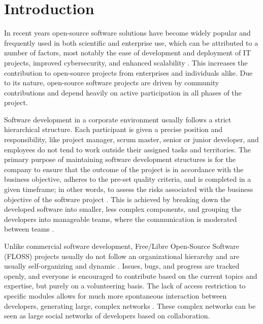 \thepage
\section{Introduction}


In recent years open-source software solutions have become widely popular and frequently used in both scientific and enterprise use, which can be attributed to a number of factors, most notably the ease of development and deployment of IT projects, improved cybersecurity, and enhanced scalability \cite{pwcLeadingBenefitsOpensource2016}. This increases the contribution to open-source projects from enterprises and individuals alike. Due to its nature, open-source software projects are driven by community contributions and depend heavily on active participation in all phases of the project.

Software development in a corporate environment usually follows a strict hierarchical structure. Each participant is given a precise position and responsibility, like project manager, scrum master, senior or junior developer, and employees do not tend to work outside their assigned tasks and territories. The primary purpose of maintaining software development structures is for the company to ensure that the outcome of the project is in accordance with the business objective, adheres to the pre-set quality criteria, and is completed in a given timeframe; in other words, to assess the risks associated with the business objective of the software project \cite{surekaUsingSocialNetwork2011}. This is achieved by breaking down the developed software into smaller, less complex components, and grouping the developers into manageable teams, where the communication is moderated between teams \cite{birdLatentSocialStructure2008}.

Unlike commercial software development, Free/Libre Open-Source Software (FLOSS) projects usually do not follow an organizational hierarchy and are usually self-organizing and dynamic \cite{birdLatentSocialStructure2008}. Issues, bugs, and progress are tracked openly, and everyone is encouraged to contribute based on the current topics and expertise, but purely on a volunteering basis. The lack of access restriction to specific modules allows for much more spontaneous interaction between developers, generating large, complex networks \cite{martinez-romoUsingSocialNetwork2008}. These complex networks can be seen as large social networks of developers based on collaboration.

